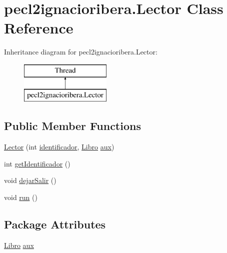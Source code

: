 \hypertarget{classpecl2ignacioribera_1_1_lector}{}\section{pecl2ignacioribera.\+Lector Class Reference}
\label{classpecl2ignacioribera_1_1_lector}
Inheritance diagram for pecl2ignacioribera.\+Lector\+:\begin{figure}[H]
\begin{center}
\leavevmode
\includegraphics[height=2.000000cm]{classpecl2ignacioribera_1_1_lector}
\end{center}
\end{figure}
\subsection*{Public Member Functions}
\begin{DoxyCompactItemize}
\item 
\mbox{\hyperlink{classpecl2ignacioribera_1_1_lector_ac4d5e23d8071e1ccb0675838b0c23bee}{Lector}} (int \mbox{\hyperlink{classpecl2ignacioribera_1_1_lector_a5ac527a198591eefd058ee83f6f0837e}{identificador}}, \mbox{\hyperlink{classpecl2ignacioribera_1_1_libro}{Libro}} \mbox{\hyperlink{classpecl2ignacioribera_1_1_lector_a6036872628f80d526e0d2dc874811b36}{aux}})
\item 
int \mbox{\hyperlink{classpecl2ignacioribera_1_1_lector_a8e5c6fced481aeba237d79a0bde0f6bd}{get\+Identificador}} ()
\item 
void \mbox{\hyperlink{classpecl2ignacioribera_1_1_lector_ac1b774e41238c52f6db484f5cd1076d1}{dejar\+Salir}} ()
\item 
void \mbox{\hyperlink{classpecl2ignacioribera_1_1_lector_ac3d0f490e7670d18a5d9d70bfce821e5}{run}} ()
\end{DoxyCompactItemize}
\subsection*{Package Attributes}
\begin{DoxyCompactItemize}
\item 
\mbox{\hyperlink{classpecl2ignacioribera_1_1_libro}{Libro}} \mbox{\hyperlink{classpecl2ignacioribera_1_1_lector_a6036872628f80d526e0d2dc874811b36}{aux}}
\end{DoxyCompactItemize}
